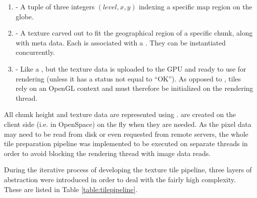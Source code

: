 \begin{enumerate}
	\item \textbf{} - A tuple of three integers $(level, x, y)$ indexing a specific map region on the globe.
	\item \textbf{} - A texture carved out to fit the geographical region of a specific chunk, along with meta data. Each  is associated with a . They can be instantiated concurrently.
	\item \textbf{} - Like a , but the texture data is uploaded to the GPU and ready to use for rendering (unless it has a status not equal to ``OK''). As opposed to , tiles rely on an OpenGL context and must therefore be initialized on the rendering thread.
\end{enumerate}

All chunk height and texture data are represented using .  are created on the client side (i.e. in OpenSpace) on the fly when they are needed. As the pixel data may need to be read from disk or even requested from remote servers, the whole tile preparation pipeline was implemented to be executed on separate threads in order to avoid blocking the rendering thread with image data reads. 

During the iterative process of developing the texture tile pipeline, three layers of abstraction were introduced in order to deal with the fairly high complexity. These are listed in Table \ref{table:tilepipeline}.

\begin{center}
  \begin{table}
  \caption[]{Abstraction layers used in the texture data pipeline.}
    \label{table:tilepipeline}
  \end{table}
\end{center}

